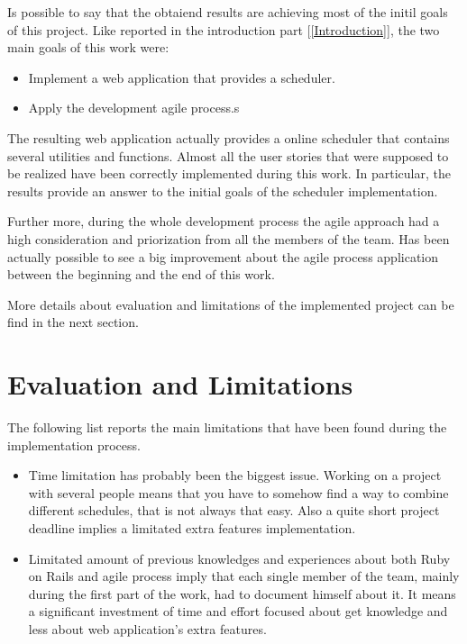 Is possible to say that the obtaiend results are achieving most of the initil goals of this project. 
Like reported in the introduction part [\ref{Introduction}], the two main goals of this work were: 
\vspace{-5mm}
\begin{itemize}
 \setlength{\itemsep}{-5pt}
 \item Implement a web application that provides a scheduler.
 \item Apply the development agile process.s
\end{itemize}

The resulting web application actually provides a online scheduler that contains several utilities and functions. Almost all the user stories that were supposed to be realized have been correctly implemented during this work. In particular, the results provide an answer to the initial goals of the scheduler implementation. 

Further more, during the whole development process the agile approach had a high consideration and priorization from all the members of the team. Has been actually possible to see a big improvement about the agile process application between the beginning and the end of this work.

More details about evaluation and limitations of the implemented project can be find in the next section.
\section{Evaluation and Limitations}
\vspace{-5mm}
\label{Evaluation}
The following list reports the main limitations that have been found during the implementation process.
\vspace{-5mm}
\begin{itemize}
 \setlength{\itemsep}{-5pt}
\item Time limitation has probably been the biggest issue. Working on a project with several people means that you have to somehow find a way to combine different schedules, that is not always that easy. Also a quite short project deadline implies a limitated extra features implementation.
\item Limitated amount of previous knowledges and experiences about both Ruby on Rails and agile process imply that each single member of the team, mainly during the first part of the work, had to document himself about it. It means a significant investment of time and effort focused about get knowledge and less about web application's extra features. 
\end{itemize}


